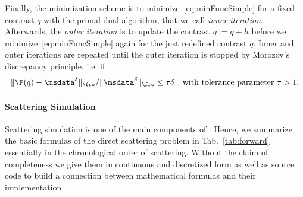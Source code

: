\documentclass[a4paper]{article}
\begin{document}
Finally, the minimization scheme is to minimize~\eqref{eq:minFuncSimple} for a fixed contrast $q$ with the primal-dual algorithm, that we call \emph{inner iteration}. Afterwards, the \emph{outer iteration} is to update the contrast $q:= q+h$ before we minimize~\eqref{eq:minFuncSimple} again for the just redefined contrast $q$. Inner and outer iterations are repeated until the outer iteration is stopped by Morozov's discrepancy principle, i.e. if
\begin{equation}\label{eq:morozov}
\|\F(q) - \msdata^\delta \|_\fro / \|\msdata^\delta \|_\fro \leq \tau \delta \quad \text{with tolerance parameter } \tau > 1.
\end{equation}

\paragraph{Scattering Simulation} Scattering simulation is one of the main components of \IPscatt. Hence, we summarize the basic formulas of the direct scattering problem in Tab.~\ref{tab:forward} essentially in the chronological order of scattering. 
Without the claim of completeness we give them in continuous and discretized form as well as source code to build a connection between mathematical formulas and their implementation. 

\end{document}
